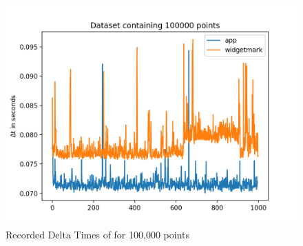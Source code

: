\begin{figure}[h]
    \centering
    \includegraphics[width=12cm]{resources/img/evaluation/Eval_100000}
    \caption{
        Recorded Delta Times of for 100,000 points
    }
    \label{a:tab:evaluation:100000}
\end{figure}


\clearpage






